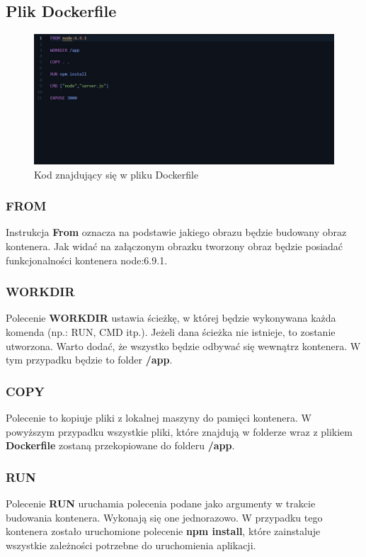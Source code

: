 \documentclass[12pt, a4paper]{article}
\begin{document}
    \subsection{Plik Dockerfile}
        \begin{figure}[!h]
            \centering
            \includegraphics[width = \textwidth]{docker-file.JPG}
            \caption{Kod znajdujący się w pliku Dockerfile}
            \label{fig:dockerfile}
        \end{figure}
        \subsubsection{FROM} 
            Instrukcja \textbf{From} oznacza na podstawie jakiego obrazu będzie budowany obraz kontenera. Jak widać na załączonym obrazku tworzony obraz będzie posiadać funkcjonalności kontenera node:6.9.1.
        \subsubsection{WORKDIR} 
            Polecenie \textbf{WORKDIR} ustawia ścieżkę, w której będzie wykonywana każda komenda (np.: RUN, CMD itp.). Jeżeli dana ścieżka nie istnieje, to zostanie utworzona. Warto dodać, że wszystko będzie odbywać się wewnątrz kontenera. W tym przypadku będzie to folder \textbf{/app}.
        \subsubsection{COPY} 
            Polecenie to kopiuje pliki z lokalnej maszyny do pamięci kontenera. W powyższym przypadku wszystkie pliki, które znajdują w folderze wraz z plikiem \textbf{Dockerfile} zostaną przekopiowane do folderu \textbf{/app}.
        \subsubsection{RUN}
            Polecenie \textbf{RUN} uruchamia polecenia podane jako argumenty w trakcie budowania kontenera. Wykonają się one jednorazowo. W przypadku tego kontenera zostało uruchomione polecenie \textbf{npm install}, które zainstaluje wszystkie zależności potrzebne do uruchomienia aplikacji.
\end{document}
